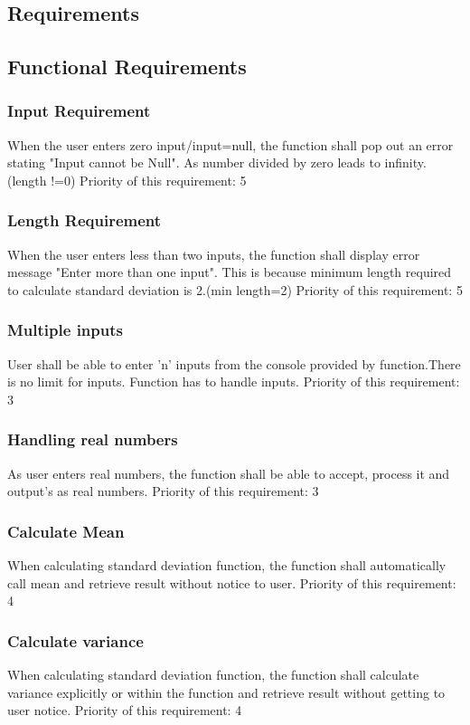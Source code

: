 \documentclass{article}
\begin{document}
\begin{titlepage}
\section{Requirements}
\subsection{Functional Requirements}
\subsubsection{Input Requirement}
When the user enters zero input/input=null, the function shall pop out an error stating "Input cannot be Null". As number divided by zero leads to infinity. (length !=0)\newline
Priority of this requirement: 5
\subsubsection{Length Requirement}
When the user enters less than two inputs, the function shall display error message "Enter more than one input". This is because minimum length required to calculate standard deviation is 2.(min length=2)\newline
Priority of this requirement: 5
\subsubsection{Multiple inputs}
User shall be able to enter 'n' inputs from the console provided by function.There is no limit for inputs. Function has to handle inputs.\newline
Priority of this requirement: 3
\subsubsection{Handling real numbers}
As user enters real numbers, the function shall be able to accept, process it and output's as real numbers.\newline
Priority of this requirement: 3
\subsubsection{Calculate Mean}
When calculating standard deviation function, the function shall automatically call mean and retrieve result without notice to user. \newline
Priority of this requirement: 4
\subsubsection{Calculate variance}
When calculating standard deviation function, the function shall calculate variance explicitly or within the function and retrieve result without getting to user notice. \newline
Priority of this requirement: 4

\end{titlepage}
\end{document}
